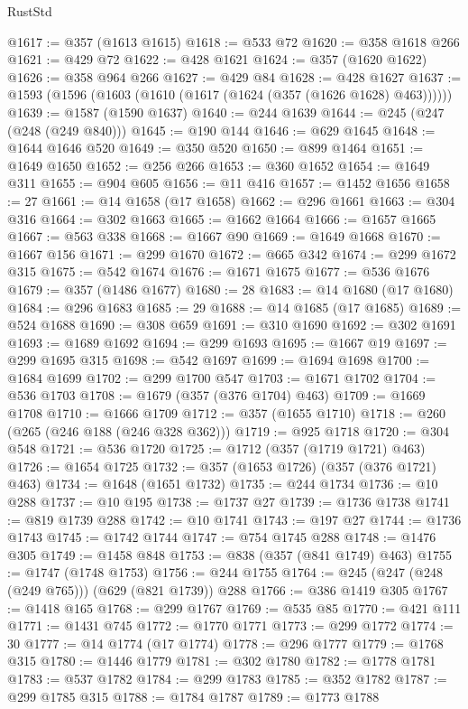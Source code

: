 \begin{lexlean}{RustStd}
\begin{coremodule}
@1617 := @357 (@1613 @1615)
@1618 := @533 @72
@1620 := @358 @1618 @266
@1621 := @429 @72
@1622 := @428 @1621
@1624 := @357 (@1620 @1622)
@1626 := @358 @964 @266
@1627 := @429 @84
@1628 := @428 @1627
@1637 := @1593 (@1596 (@1603 (@1610 (@1617 (@1624 (@357 (@1626 @1628) @463))))))
@1639 := @1587 (@1590 @1637)
@1640 := @244 @1639
@1644 := @245 (@247 (@248 (@249 @840)))
@1645 := @190 @144
@1646 := @629 @1645
@1648 := @1644 @1646 @520
@1649 := @350 @520
@1650 := @899 @1464
@1651 := @1649 @1650
@1652 := @256 @266
@1653 := @360 @1652
@1654 := @1649 @311
@1655 := @904 @605
@1656 := @11 @416
@1657 := @1452 @1656
@1658 := 27
@1661 := @14 @1658 (@17 @1658)
@1662 := @296 @1661
@1663 := @304 @316
@1664 := @302 @1663
@1665 := @1662 @1664
@1666 := @1657 @1665
@1667 := @563 @338
@1668 := @1667 @90
@1669 := @1649 @1668
@1670 := @1667 @156
@1671 := @299 @1670
@1672 := @665 @342
@1674 := @299 @1672 @315
@1675 := @542 @1674
@1676 := @1671 @1675
@1677 := @536 @1676
@1679 := @357 (@1486 @1677)
@1680 := 28
@1683 := @14 @1680 (@17 @1680)
@1684 := @296 @1683
@1685 := 29
@1688 := @14 @1685 (@17 @1685)
@1689 := @524 @1688
@1690 := @308 @659
@1691 := @310 @1690
@1692 := @302 @1691
@1693 := @1689 @1692
@1694 := @299 @1693
@1695 := @1667 @19
@1697 := @299 @1695 @315
@1698 := @542 @1697
@1699 := @1694 @1698
@1700 := @1684 @1699
@1702 := @299 @1700 @547
@1703 := @1671 @1702
@1704 := @536 @1703
@1708 := @1679 (@357 (@376 @1704) @463)
@1709 := @1669 @1708
@1710 := @1666 @1709
@1712 := @357 (@1655 @1710)
@1718 := @260 (@265 (@246 @188 (@246 @328 @362)))
@1719 := @925 @1718
@1720 := @304 @548
@1721 := @536 @1720
@1725 := @1712 (@357 (@1719 @1721) @463)
@1726 := @1654 @1725
@1732 := @357 (@1653 @1726) (@357 (@376 @1721) @463)
@1734 := @1648 (@1651 @1732)
@1735 := @244 @1734
@1736 := @10 @288
@1737 := @10 @195
@1738 := @1737 @27
@1739 := @1736 @1738
@1741 := @819 @1739 @288
@1742 := @10 @1741
@1743 := @197 @27
@1744 := @1736 @1743
@1745 := @1742 @1744
@1747 := @754 @1745 @288
@1748 := @1476 @305
@1749 := @1458 @848
@1753 := @838 (@357 (@841 @1749) @463)
@1755 := @1747 (@1748 @1753)
@1756 := @244 @1755
@1764 := @245 (@247 (@248 (@249 @765))) (@629 (@821 @1739)) @288
@1766 := @386 @1419 @305
@1767 := @1418 @165
@1768 := @299 @1767
@1769 := @535 @85
@1770 := @421 @111
@1771 := @1431 @745
@1772 := @1770 @1771
@1773 := @299 @1772
@1774 := 30
@1777 := @14 @1774 (@17 @1774)
@1778 := @296 @1777
@1779 := @1768 @315
@1780 := @1446 @1779
@1781 := @302 @1780
@1782 := @1778 @1781
@1783 := @537 @1782
@1784 := @299 @1783
@1785 := @352 @1782
@1787 := @299 @1785 @315
@1788 := @1784 @1787
@1789 := @1773 @1788

\end{coremodule}
\end{lexlean}
